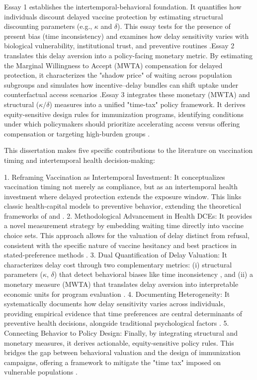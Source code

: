 \documentclass[doublespacing]{utdthesis}
\let\cite=\citep
\begin{document}
Essay 1 establishes the intertemporal-behavioral foundation. It quantifies how individuals discount delayed vaccine protection by estimating structural discounting parameters (e.g., $\kappa$ and $\delta$). This essay tests for the presence of present bias (time inconsistency) and examines how delay sensitivity varies with biological vulnerability, institutional trust, and preventive routines \cite{Frederick2002, Laibson1997, Attema2018}.Essay 2 translates this delay aversion into a policy-facing monetary metric. By estimating the Marginal Willingness to Accept (MWTA) compensation for delayed protection, it characterizes the "shadow price" of waiting across population subgroups and simulates how incentive–delay bundles can shift uptake under counterfactual access scenarios \cite{Louviere2000, Train2009}.Essay 3 integrates these monetary (MWTA) and structural ($\kappa/\delta$) measures into a unified "time-tax" policy framework. It derives equity-sensitive design rules for immunization programs, identifying conditions under which policymakers should prioritize accelerating access versus offering compensation or targeting high-burden groups \cite{Attema2018, Brewer2017}.


This dissertation makes five specific contributions to the literature on vaccination timing and intertemporal health decision-making:

1. Reframing Vaccination as Intertemporal Investment: It conceptualizes vaccination timing not merely as compliance, but as an intertemporal health investment where delayed protection extends the exposure window. This links classic health-capital models to preventive behavior, extending the theoretical frameworks of \citet{Grossman1972} and \citet{Cropper1977}.
2. Methodological Advancement in Health DCEs: It provides a novel measurement strategy by embedding waiting time directly into vaccine choice sets. This approach allows for the valuation of delay distinct from refusal, consistent with the specific nature of vaccine hesitancy \cite{MacDonald2015_SAGE} and best practices in stated-preference methods \cite{Louviere2000, Johnson2013ISPOR}.
3. Dual Quantification of Delay Valuation: It characterizes delay cost through two complementary metrics: (i) structural parameters ($\kappa$, $\delta$) that detect behavioral biases like time inconsistency \cite{Frederick2002, ODonoghueRabin1999}, and (ii) a monetary measure (MWTA) that translates delay aversion into interpretable economic units for program evaluation \cite{Train2009}.
4. Documenting Heterogeneity: It systematically documents how delay sensitivity varies across individuals, providing empirical evidence that time preferences are central determinants of preventive health decisions, alongside traditional psychological factors \cite{Chapman2005, Brewer2017}.
5. Connecting Behavior to Policy Design: Finally, by integrating structural and monetary measures, it derives actionable, equity-sensitive policy rules. This bridges the gap between behavioral valuation and the design of immunization campaigns, offering a framework to mitigate the "time tax" imposed on vulnerable populations \cite{Attema2018, Baicker2011}.
\end{document}
